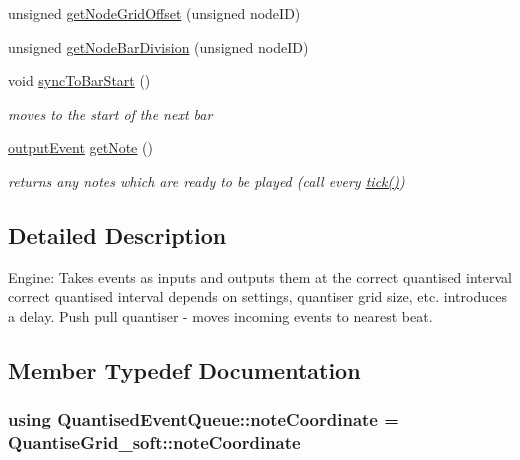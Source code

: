 \begin{DoxyCompactItemize}
unsigned \hyperlink{classQuantisedEventQueue_a003bdcedf16297e3e2e6ed90c413da4c}{get\+Node\+Grid\+Offset} (unsigned node\+ID)
\item 
unsigned \hyperlink{classQuantisedEventQueue_a21c0f8d70e22bb02dcb110ecc610a9dd}{get\+Node\+Bar\+Division} (unsigned node\+ID)
\item 
void \hyperlink{classQuantisedEventQueue_ab14d954f402e83c2aaed7ff38a73ac47}{sync\+To\+Bar\+Start} ()
\begin{DoxyCompactList}\small\item\em moves to the start of the next bar \end{DoxyCompactList}\item 
\hyperlink{structQuantisedEventQueue_1_1outputEvent}{output\+Event} \hyperlink{classQuantisedEventQueue_a6ebb7d37bfc138463be87361c44f0307}{get\+Note} ()
\begin{DoxyCompactList}\small\item\em returns any notes which are ready to be played (call every \hyperlink{classQuantisedEventQueue_a97055bead1291aef1d540640fcb61bf9}{tick()}) \end{DoxyCompactList}\end{DoxyCompactItemize}


\subsection{Detailed Description}
Engine\+: Takes events as inputs and outputs them at the correct quantised interval correct quantised interval depends on settings, quantiser grid size, etc. introduces a delay. Push pull quantiser -\/ moves incoming events to nearest beat. 

\subsection{Member Typedef Documentation}
\subsubsection[{\texorpdfstring{note\+Coordinate}{noteCoordinate}}]{\setlength{\rightskip}{0pt plus 5cm}using {\bf Quantised\+Event\+Queue\+::note\+Coordinate} =  {\bf Quantise\+Grid\+\_\+soft\+::note\+Coordinate}}\hypertarget{classQuantisedEventQueue_a7e4af70d71f881cb31e643f59c6cf6e6}{}\label{classQuantisedEventQueue_a7e4af70d71f881cb31e643f59c6cf6e6}


